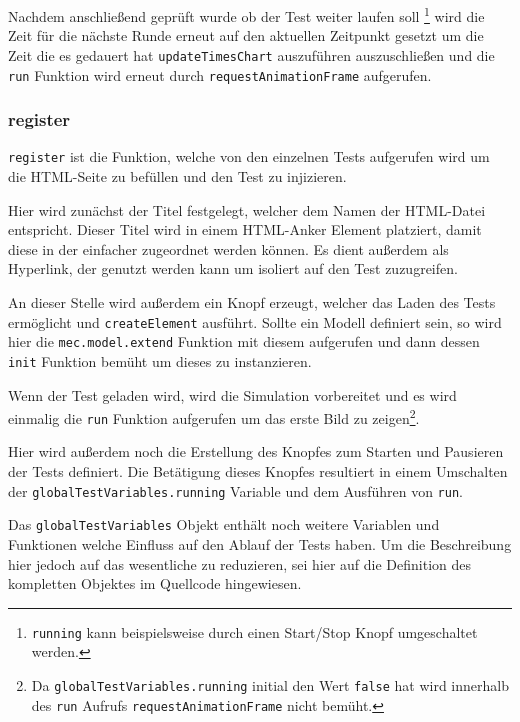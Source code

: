 Nachdem anschließend geprüft wurde ob der Test weiter laufen soll \footnote{\lstinline{running} kann beispielsweise durch einen Start/Stop Knopf umgeschaltet werden.} wird die Zeit für die nächste Runde erneut auf den aktuellen Zeitpunkt gesetzt um die Zeit die es gedauert hat \lstinline{updateTimesChart} auszuführen auszuschließen und die \lstinline{run} Funktion wird erneut durch \lstinline{requestAnimationFrame} aufgerufen.

\subsubsection{register}\label{ch:gtv_register}

\lstinline{register} ist die Funktion, welche von den einzelnen Tests aufgerufen wird um die HTML-Seite zu befüllen und den Test zu injizieren.

Hier wird zunächst der Titel festgelegt, welcher dem Namen der HTML-Datei entspricht.
Dieser Titel wird in einem HTML-Anker Element %
platziert, damit diese in der  einfacher zugeordnet werden können.
Es dient außerdem als Hyperlink, der genutzt werden kann um isoliert auf den Test zuzugreifen.

An dieser Stelle wird außerdem ein Knopf erzeugt, welcher das Laden des Tests ermöglicht und \lstinline{createElement} ausführt.
Sollte ein  Modell definiert sein, so wird hier die \lstinline{mec.model.extend} Funktion mit diesem aufgerufen und dann dessen \lstinline{init} Funktion bemüht um dieses zu instanzieren. %

Wenn der Test geladen wird, wird die Simulation vorbereitet und es wird einmalig die \lstinline{run} Funktion aufgerufen um das erste Bild zu zeigen\footnote{Da \lstinline{globalTestVariables.running} initial den Wert \lstinline{false} hat wird innerhalb des \lstinline{run} Aufrufs \lstinline{requestAnimationFrame} nicht bemüht.}.

Hier wird außerdem noch die Erstellung des Knopfes zum Starten und Pausieren der Tests definiert.
Die Betätigung dieses Knopfes resultiert in einem Umschalten der \lstinline{globalTestVariables.running} Variable und dem Ausführen von \lstinline{run}.

Das \lstinline{globalTestVariables} Objekt enthält noch weitere Variablen und Funktionen welche Einfluss auf den Ablauf der Tests haben.
Um die Beschreibung hier jedoch auf das wesentliche zu reduzieren, sei hier auf die Definition des kompletten Objektes im Quellcode %
hingewiesen.

